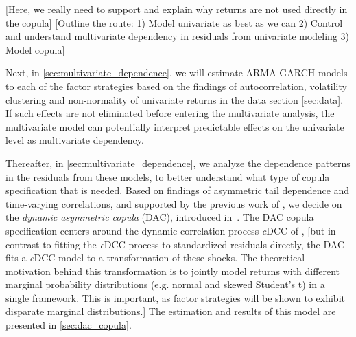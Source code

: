 
[Here, we really need to support and explain why returns are not used directly in the copula]
[Outline the route: 1) Model univariate as best as we can 2) Control and understand multivariate dependency in residuals from univariate modeling 3) Model copula]

Next, in \autoref{sec:multivariate_dependence}, we will estimate ARMA-GARCH models to each of the factor strategies based on the findings of autocorrelation, volatility clustering and non-normality of univariate returns in the data section \autoref{sec:data}. If such effects are not eliminated before entering the multivariate analysis, the multivariate model can potentially interpret predictable effects on the univariate level as multivariate dependency. 

Thereafter, in \autoref{sec:multivariate_dependence}, we analyze the dependence patterns in the residuals from these models, to better understand what type of copula specification that is needed. Based on findings of asymmetric tail dependence and time-varying correlations, and supported by the previous work of \textcite{ChristoffersenLanglois2013}, we decide on the \emph{dynamic asymmetric copula} (DAC), introduced in~\autocite{ChristoffersenErrunzaJacobLanglois2012}. The DAC copula specification centers around the dynamic correlation process \textit{c}DCC of \textcite{Aielli2013}, [but in contrast to fitting the \emph{c}DCC process to standardized residuals directly, the DAC fits a \emph{c}DCC model to a transformation of these shocks. The theoretical motivation behind this transformation is to jointly model returns with different marginal probability distributions (e.g. normal and skewed Student's t) in a single framework. This is important, as factor strategies will be shown to exhibit disparate marginal distributions.] The estimation and results of this model are presented in \autoref{sec:dac_copula}.

